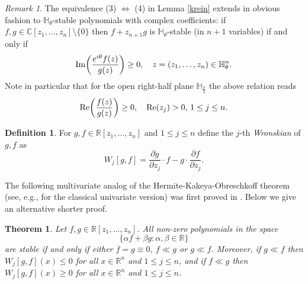 \documentclass[10pt,reqno]{amsart}
\theoremstyle{plain}
\newtheorem{theorem}{Theorem}[section]
\theoremstyle{definition}
\newtheorem{definition}{Definition}[section]
\theoremstyle{remark}
\newtheorem{remark}{Remark}[section]
\numberwithin{equation}{section}
\newcommand{\bH}{\mathbb{H}}
\newcommand{\RR}{\mathbb{R}}
\newcommand{\CC}{\mathbb{C}}
\renewcommand{\Im}{{\rm Im}}
\renewcommand{\Re}{{\rm Re}}
\begin{document}
\begin{remark}\label{r-krein}
The equivalence (3) $\Leftrightarrow$ (4) in Lemma \ref{krein} extends in
obvious fashion to $\bH_\theta$-stable polynomials with complex coefficients: 
if 
$f,g\in\CC[z_1,\ldots,z_n]\setminus \{0\}$ then $f+z_{n+1}g$ is 
$\bH_\theta$-stable (in $n+1$ variables) if and only if
$$
\Im\!\left(\frac{e^{i\theta}f(z)}{g(z)}\right)\ge 0,
\quad z=(z_1,\ldots,z_n)\in\bH_\theta^n.
$$
Note in particular that for the open right-half plane 
$\bH_{\frac{\pi}{2}}$ the above relation reads
$$
\Re\!\left(\frac{f(z)}{g(z)}\right)\ge 0,
\quad \Re(z_j)>0,\,1\le j\le n.
$$
\end{remark}

\begin{definition}\label{j-W}
For $g,f \in \RR[z_1,\ldots, z_n]$ and $1 \leq j \leq n$ define the $j$-th 
{\em Wronskian} of $g,f$  as 
$$
W_j[g,f] 
=\frac{\partial g}{\partial z_j}\cdot f-g\cdot\frac{\partial f}{\partial z_j}.
$$
\end{definition}

The following multivariate analog of the Hermite-Kakeya-Obreschkoff 
theorem (see, e.g., \cite[Theorem 6.3.8]{RS} for the classical univariate 
version) was first proved in 
\cite{BBS3}. Below we give an alternative shorter proof. 

\begin{theorem}\label{th-HKO}
Let $f,g \in \RR[z_1,\ldots, z_n]$. All non-zero polynomials in the space 
$$
\{\alpha f + \beta g : \alpha, \beta \in \RR\}
$$
are stable if and only if either $f=g\equiv 0$, $f \ll g$ or $g\ll f$. 
Moreover, if $g \ll f$ then  $W_j[g,f](x) \leq 0$  for all $x \in \RR^n$ and 
$1\leq j \leq n$, and if 
$f \ll g$ then  $W_j[g,f](x) \geq 0$  for all $x \in \RR^n$ and 
$1\leq j \leq n$. 
\end{theorem}
\end{document}
